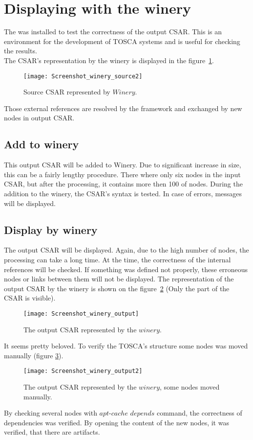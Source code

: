 \section{Displaying with the winery}\label{sec:checkwin}
 The  was installed to test the correctness of the output CSAR. 
 This is an environment for the development of TOSCA systems and is useful for checking the results. \\
 The CSAR's representation by the winery is displayed in the figure~\ref{fig:winery_source2}.
\begin{figure}[ht]   
	\centering
	\texttt{[image: Screenshot\_winery\_source2]}
	\caption{Source CSAR represented by $Winery$.}
	\label{fig:winery_source2}
\end{figure}
 Those external references are resolved by the framework and exchanged by new nodes in output CSAR. \subsection{Add to winery}
 This output CSAR will be added to Winery.
 Due to significant increase in size, this can be a fairly lengthy procedure.
 There where only six nodes in the input CSAR, but after the processing, it contains more then 100 of nodes.
 During the addition to the winery, the CSAR's syntax is tested.
 In case of errors, messages will be displayed.
 \subsection{Display by winery}
 The output CSAR will be displayed.
 Again, due to the high number of nodes, the processing can take a long time. 
 At the time, the correctness of the internal references will be checked.
 If something was defined not properly, these erroneous nodes or links between them will not be displayed.
The representation of the output CSAR by the winery is shown on the figure~\ref{fig:winery_output} (Only the part of the CSAR is visible).
\begin{figure}[ht]   
	\centering
	\texttt{[image: Screenshot\_winery\_output]}  
	\caption{The output CSAR represented by the $winery$.}
	\label{fig:winery_output}
\end{figure}
 It seems pretty beloved.
 To verify the TOSCA's structure some nodes was moved manually (figure \ref{fig:winery_output2}). 
 \begin{figure}[ht]   
 	\centering
 	\texttt{[image: Screenshot\_winery\_output2]}
 	\caption{The output CSAR represented by the $winery$, some nodes moved manually.}
 	\label{fig:winery_output2}
 \end{figure}
 By checking several nodes with $apt$-$cache$ $depends$ command, the correctness of dependencies was verified.
 By opening the content of the new nodes, it was verified, that there are artifacts.

